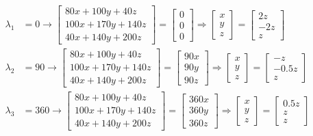 \begin{align}
    \lambda_1 &= 0 \rightarrow \begin{bmatrix}
        80 x + 100 y + 40 z \\
        100 x + 170 y + 140 z \\
        40 x + 140 y + 200 z
        \end{bmatrix} = \begin{bmatrix}
        0 \\ 0 \\ 0
        \end{bmatrix} \Rightarrow \begin{bmatrix}
        x \\ y \\ z
        \end{bmatrix} = \begin{bmatrix}
        2z \\ -2z \\ z
        \end{bmatrix}
    \nonumber \\
    \lambda_2 &= 90 \rightarrow \begin{bmatrix}
        80 x + 100 y + 40 z \\
        100 x + 170 y + 140 z \\
        40 x + 140 y + 200 z
        \end{bmatrix} = \begin{bmatrix}
        90x \\ 90y \\ 90z
        \end{bmatrix} \Rightarrow \begin{bmatrix}
        x \\ y \\ z
        \end{bmatrix} = \begin{bmatrix}
        -z \\ -0.5z \\ z
        \end{bmatrix}
    \nonumber \\
    \lambda_3 &= 360 \rightarrow \begin{bmatrix}
        80 x + 100 y + 40 z \\
        100 x + 170 y + 140 z \\
        40 x + 140 y + 200 z
        \end{bmatrix} = \begin{bmatrix}
        360x \\ 360y \\ 360z
        \end{bmatrix} \Rightarrow \begin{bmatrix}
        x \\ y \\ z
        \end{bmatrix} = \begin{bmatrix}
        0.5z \\ z \\ z
        \end{bmatrix}
    \nonumber
\end{align}

